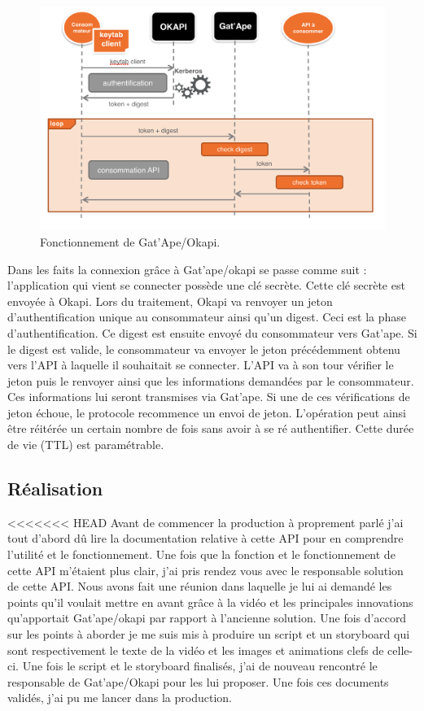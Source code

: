 \begin{figure}[htp]
  \centering
  \includegraphics[width=15cm]{images/gao/gao1}
  \caption{Fonctionnement de Gat'Ape/Okapi.}
  \label{gatape}
\end{figure}


Dans les faits la connexion grâce à Gat'ape/okapi se passe comme suit : 
l'application qui vient se connecter possède une clé secrète. Cette clé secrète est envoyée à Okapi. Lors du traitement, Okapi va renvoyer un jeton d'authentification unique au consommateur ainsi qu'un digest. Ceci est la phase d'authentification.  Ce digest est ensuite envoyé du consommateur vers Gat'ape. Si le digest est valide, le consommateur va envoyer le jeton précédemment obtenu vers l'API à laquelle il souhaitait se connecter. L'API va à son tour vérifier le jeton puis le renvoyer ainsi que les informations demandées par le consommateur. Ces informations lui seront transmises via Gat'ape. Si une de ces vérifications de jeton échoue, le protocole recommence un envoi de jeton. L'opération peut ainsi être réitérée un certain nombre de fois sans avoir à se ré authentifier. Cette durée de vie (TTL) est paramétrable.




\subsection{Réalisation}
<<<<<<< HEAD
Avant de commencer la production à proprement parlé j'ai tout d'abord dû lire la documentation relative à cette API pour en comprendre l'utilité et le fonctionnement. Une fois que la fonction et le fonctionnement de cette API m'étaient plus clair, j'ai pris rendez vous avec le responsable solution de cette API. Nous avons fait une réunion dans laquelle je lui ai demandé les points qu'il voulait mettre en avant grâce à la vidéo et les principales innovations qu'apportait Gat'ape/okapi par rapport à l'ancienne solution. Une fois d'accord sur les points à aborder je me suis mis à produire un script et un storyboard qui sont respectivement le texte de la vidéo et les images et animations clefs de celle-ci. Une fois le script et le storyboard finalisés, j'ai de nouveau rencontré le responsable de Gat'ape/Okapi pour les lui proposer. Une fois ces documents validés, j'ai pu me lancer dans la production. \\

